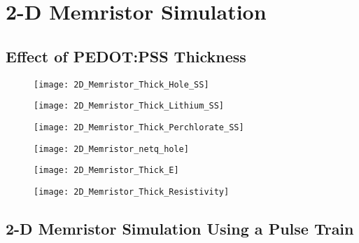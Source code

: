 
\chapter{2-D Memristor Simulation} %

\label{Chapter6} %


\section{Effect of PEDOT:PSS Thickness}


\begin{figure}[!htp]
\centering
\texttt{[image: 2D\_Memristor\_Thick\_Hole\_SS]}
\caption{} 
\label{}
\end{figure}

\begin{figure}[!htp]
\centering
\texttt{[image: 2D\_Memristor\_Thick\_Lithium\_SS]}
\caption{} 
\label{}
\end{figure}

\begin{figure}[!htp]
\centering
\texttt{[image: 2D\_Memristor\_Thick\_Perchlorate\_SS]}
\caption{} 
\label{}
\end{figure}


\begin{figure}[!htp]
\centering
\texttt{[image: 2D\_Memristor\_netq\_hole]}
\caption{} 
\label{}
\end{figure}


\begin{figure}[!htp]
\centering
\texttt{[image: 2D\_Memristor\_Thick\_E]}
\caption{} 
\label{}
\end{figure}


\begin{figure}[!htp]
\centering
\texttt{[image: 2D\_Memristor\_Thick\_Resistivity]}
\caption{} 
\label{}
\end{figure}

\clearpage
\section{2-D Memristor Simulation Using a Pulse Train}

